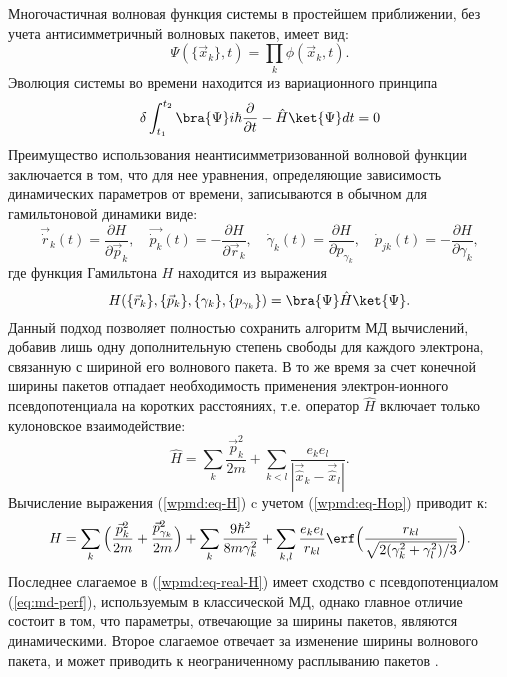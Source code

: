 Многочастичная волновая функция системы в простейшем приближении, без учета антисимметричный волновых пакетов, имеет вид:
\begin{equation}
	\label{wpmd:eq-psi-full}
	\Psi(\{\vec{x}_k \}, t)=\prod_k \phi(\vec{x}_k, t).
\end{equation}
Эволюция системы во времени находится из вариационного принципа
\begin{equation*}
	\delta\int_{t_1}^{t_2} \bra{\Psi} i\hbar \frac{\partial}{\partial t} - \hat{H} \ket{\Psi}dt=0
\end{equation*}
Преимущество использования неантисимметризованной волновой функции заключается в том, что для нее уравнения, определяющие зависимость динамических параметров от времени, записываются в обычном для гамильтоновой динамики виде:
\begin{equation}
	\label{wpmd:eq-dynamics}
	\vec{\dot{r}}_k(t)=\frac{\partial H}{\partial \vec{p}_k}, \quad
	\vec{\dot{p}_k}(t)= - \frac{\partial H}{\partial \vec{r}_k}, \quad
	\dot{\gamma}_k(t)= \frac{\partial H}{\partial p_{\gamma_k}}, \quad
	\dot{p}_{jk}(t)=-\frac{\partial H}{\partial \gamma_k},
\end{equation}
где функция Гамильтона $H$ находится из выражения
\begin{equation}
	\label{wpmd:eq-H}
	H(\{\vec r_k\}, \{ \vec p_k \}, \{\gamma_k\}, \{p_{\gamma_k} \}) = \bra{\Psi} \hat{H} \ket{\Psi}.
\end{equation}
Данный подход позволяет полностью сохранить алгоритм МД вычислений, добавив лишь одну дополнительную степень свободы для каждого электрона, связанную с шириной его волнового пакета. В то же время за счет конечной ширины пакетов отпадает необходимость применения электрон-ионного псевдопотенциала на коротких расстояниях, т.е. оператор $\hat H$ включает только кулоновское взаимодействие:
\begin{equation}
	\label{wpmd:eq-Hop}
	\hat H = \sum_k \frac{\vec p_k^2}{2m} + \sum_{k<l} \frac{e_k e_l}{| \vec{\hat{x}}_k - \vec{\hat{x}}_l |}.
\end{equation}
Вычисление выражения (\ref{wpmd:eq-H}) c учетом (\ref{wpmd:eq-Hop}) приводит к:
\begin{equation}
	\label{wpmd:eq-real-H}
	H = \sum_k \Big(
		\frac{\vec p_k^2}{2m} + \frac{\vec p^2_{\gamma_k}}{2m}
	\Big) + \sum_k \frac{9\hbar^2}{8m\gamma^2_k}+\sum_{k,l}\frac{e_k e_l}{r_{kl}} \erf \Big(
		\frac{r_{kl}}{\sqrt{2(\gamma_k^2 + \gamma_l^2)/3}}
	\Big).
\end{equation}
Последнее слагаемое в (\ref{wpmd:eq-real-H}) имеет сходство с псевдопотенциалом (\ref{eq:md-perf}), используемым в классической МД, однако главное отличие состоит в том, что параметры, отвечающие за ширины пакетов, являются динамическими. Второе слагаемое отвечает за изменение ширины волнового пакета, и может приводить к неограниченному расплыванию пакетов \cite{morozov2012improvement}. 

